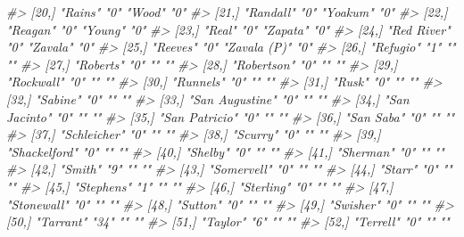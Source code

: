 \documentclass[
  12pt,
]{book}
\newenvironment{Shaded}{\begin{snugshade}}{\end{snugshade}}
\newcommand{\CommentTok}[1]{\textcolor[rgb]{0.37,0.37,0.37}{\textit{#1}}}
\begin{document}
\begin{Shaded}
\begin{Highlighting}[]
\CommentTok{\#\textgreater{} [20,] "Rains"         "0"  "Wood"          "0"  }
\CommentTok{\#\textgreater{} [21,] "Randall"       "0"  "Yoakum"        "0"  }
\CommentTok{\#\textgreater{} [22,] "Reagan"        "0"  "Young"         "0"  }
\CommentTok{\#\textgreater{} [23,] "Real"          "0"  "Zapata"        "0"  }
\CommentTok{\#\textgreater{} [24,] "Red River"     "0"  "Zavala"        "0"  }
\CommentTok{\#\textgreater{} [25,] "Reeves"        "0"  "Zavala (P)"    "0"  }
\CommentTok{\#\textgreater{} [26,] "Refugio"       "1"  ""              ""   }
\CommentTok{\#\textgreater{} [27,] "Roberts"       "0"  ""              ""   }
\CommentTok{\#\textgreater{} [28,] "Robertson"     "0"  ""              ""   }
\CommentTok{\#\textgreater{} [29,] "Rockwall"      "0"  ""              ""   }
\CommentTok{\#\textgreater{} [30,] "Runnels"       "0"  ""              ""   }
\CommentTok{\#\textgreater{} [31,] "Rusk"          "0"  ""              ""   }
\CommentTok{\#\textgreater{} [32,] "Sabine"        "0"  ""              ""   }
\CommentTok{\#\textgreater{} [33,] "San Augustine" "0"  ""              ""   }
\CommentTok{\#\textgreater{} [34,] "San Jacinto"   "0"  ""              ""   }
\CommentTok{\#\textgreater{} [35,] "San Patricio"  "0"  ""              ""   }
\CommentTok{\#\textgreater{} [36,] "San Saba"      "0"  ""              ""   }
\CommentTok{\#\textgreater{} [37,] "Schleicher"    "0"  ""              ""   }
\CommentTok{\#\textgreater{} [38,] "Scurry"        "0"  ""              ""   }
\CommentTok{\#\textgreater{} [39,] "Shackelford"   "0"  ""              ""   }
\CommentTok{\#\textgreater{} [40,] "Shelby"        "0"  ""              ""   }
\CommentTok{\#\textgreater{} [41,] "Sherman"       "0"  ""              ""   }
\CommentTok{\#\textgreater{} [42,] "Smith"         "9"  ""              ""   }
\CommentTok{\#\textgreater{} [43,] "Somervell"     "0"  ""              ""   }
\CommentTok{\#\textgreater{} [44,] "Starr"         "0"  ""              ""   }
\CommentTok{\#\textgreater{} [45,] "Stephens"      "1"  ""              ""   }
\CommentTok{\#\textgreater{} [46,] "Sterling"      "0"  ""              ""   }
\CommentTok{\#\textgreater{} [47,] "Stonewall"     "0"  ""              ""   }
\CommentTok{\#\textgreater{} [48,] "Sutton"        "0"  ""              ""   }
\CommentTok{\#\textgreater{} [49,] "Swisher"       "0"  ""              ""   }
\CommentTok{\#\textgreater{} [50,] "Tarrant"       "34" ""              ""   }
\CommentTok{\#\textgreater{} [51,] "Taylor"        "6"  ""              ""   }
\CommentTok{\#\textgreater{} [52,] "Terrell"       "0"  ""              ""   }

\end{Highlighting}
\end{Shaded}
\end{document}
